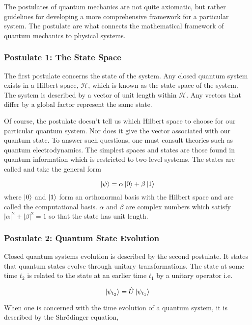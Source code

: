 The postulates of quantum mechanics are not quite axiomatic, but rather guidelines for developing a more comprehensive framework for a particular system. The postulate are what connects the mathematical framework of quantum mechanics to physical systems.

\subsubsection*{Postulate 1: The State Space}

The first postulate concerns the state of the system. Any closed quantum system exists in a Hilbert space, $\mathcal{H}$, which is known as the state space of the system. The system is described by a vector of unit length within $\mathcal{H}$. Any vectors that differ by a global factor represent the same state.

Of course, the postulate doesn't tell us which Hilbert space to choose for our particular quantum system. Nor does it give the vector associated with our quantum state. To answer such questions, one must consult theories such as quantum electrodynamics. The simplest spaces and states are those found in quantum information which is restricted to two-level systems. The states are called  and take the general form

\begin{equation}
	\ket{\psi} = \alpha\ket{0} + \beta\ket{1}
\end{equation} 
where $\ket{0}$ and $\ket{1}$ form an orthonormal basis with the Hilbert space and are called the computational basis. $\alpha$ and $\beta$ are complex numbers which satisfy $|\alpha|^2 + |\beta|^2 = 1$ so that the state has unit length.

\subsubsection*{Postulate 2: Quantum State Evolution}

Closed quantum systems evolution is described by the second postulate. It states that quantum states evolve through unitary transformations. The state at some time $t_2$ is related to the state at an earlier time $t_1$ by a unitary operator i.e.

\begin{equation}
	\ket{\psi_{t_2}} = \hat{U}\ket{\psi_{t_1}}
\end{equation}

When one is concerned with the time evolution of a quantum system, it is described by the Shr\"{o}dinger equation,

